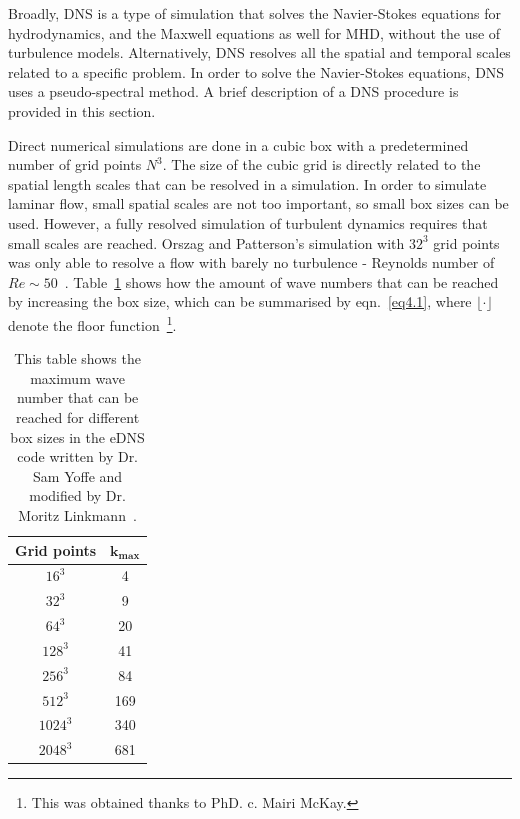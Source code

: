 \documentclass[12pt,a4paper]{report}
\begin{document}
Broadly, DNS is a type of simulation that solves the Navier-Stokes equations for hydrodynamics, and the Maxwell equations as well for MHD, without the use of turbulence models. Alternatively, DNS resolves all the spatial and temporal scales related to a specific problem. In order to solve the Navier-Stokes equations, DNS uses a pseudo-spectral method. A brief description of a DNS procedure is provided in this section. 

Direct numerical simulations are done in a cubic box with a predetermined number of grid points $N^3$. The size of the cubic grid is directly related to the spatial length scales that can be resolved in a simulation. In order to simulate laminar flow, small spatial scales are not too important, so small box sizes can be used. However, a fully resolved simulation of turbulent dynamics requires that small scales are reached. Orszag and Patterson's simulation with $32^3$ grid points was only able to resolve a flow with barely no turbulence - Reynolds number of $Re \sim 50$~\cite{moin1998direct}. Table~\ref{table4.1} shows how the amount of wave numbers that can be reached by increasing the box size, which can be summarised by eqn.~\ref{eq4.1}, where $\lfloor \cdot \rfloor$ denote the floor function~\footnote{This was obtained thanks to PhD. c. Mairi McKay.}.

\begin{table}[h]
\begin{center}
\begin{tabular}{|c|c|}
\hline
\textbf{Grid points} & $\bm{ k_{max}}$ \\
\hline
  $16^3$            &  4          \\ \hline
  $32^3$            &  9          \\ \hline
  $64^3$            &  20          \\ \hline
  $128^3$            &  41          \\ \hline
  $256^3$            &  84          \\ \hline
  $512^3$            &  169          \\ \hline
  $1024^3$            &  340          \\ \hline
  $2048^3$            &  681          \\ \hline
\end{tabular}
\end{center}
\caption{This table shows the maximum wave number that can be reached for different box sizes in the eDNS code written by Dr. Sam Yoffe and modified by Dr. Moritz Linkmann~\cite{yoffe2013investigation, LinkmannMoritzFrederikLeon2016Spim}.}
\label{table4.1}
\end{table}
\end{document}
